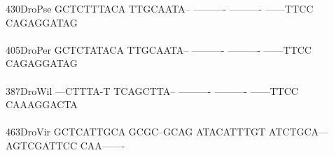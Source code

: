 \documentclass[11pt,twoside,reqno,a4paper]{article}
\begin{document}
{430\hspace*{1\charwidth}DroPse	GCTCTTTACA	TTGCAATA--	----------	----------	------TTCC	CAGAGGATAG	\\
\hspace*{4\charwidth}\hspace*{7\charwidth}\hspace*{1\charwidth}\hspace*{1\charwidth}\hspace*{1\charwidth}\hspace*{1\charwidth}\hspace*{1\charwidth}\hspace*{1\charwidth}\\
405\hspace*{1\charwidth}DroPer	GCTCTATACA	TTGCAATA--	----------	----------	------TTCC	CAGAGGATAG	\\
\hspace*{4\charwidth}\hspace*{7\charwidth}\hspace*{1\charwidth}\hspace*{1\charwidth}\hspace*{1\charwidth}\hspace*{1\charwidth}\hspace*{1\charwidth}\hspace*{1\charwidth}\\
387\hspace*{1\charwidth}DroWil	---CTTTA-T	TCAGCTTA--	----------	----------	------TTCC	CAAAGGACTA	\\
\hspace*{4\charwidth}\hspace*{7\charwidth}\hspace*{1\charwidth}\hspace*{1\charwidth}\hspace*{1\charwidth}\hspace*{1\charwidth}\hspace*{1\charwidth}\hspace*{1\charwidth}\\
463\hspace*{1\charwidth}DroVir	GCTCATTGCA	GCGC--GCAG	ATACATTTGT	ATCTGCA---	AGTCGATTCC	CAA-------	\\
\hspace*{4\charwidth}\hspace*{7\charwidth}\hspace*{1\charwidth}\hspace*{1\charwidth}\hspace*{1\charwidth}\hspace*{1\charwidth}\hspace*{1\charwidth}\hspace*{1\charwidth}\\
}
\end{document}

